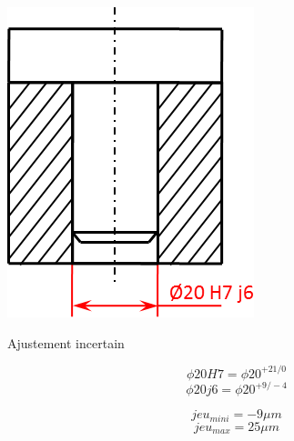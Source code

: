 \documentclass[11pt,oneside]{article}
\begin{document}
\begin{exemple}
\begin{minipage}[c]{.3\linewidth}
\end{minipage}\hfill
\begin{minipage}[c]{.3\linewidth}
\begin{center}
\includegraphics[width=.9\textwidth]{png/incertain}

Ajustement incertain
\end{center}

$$\phi 20 H7 = \phi 20^{+21/0} $$
$$\phi 20 j6 = \phi 20^{+9/-4}$$

$$jeu_{mini}= -9\mu m$$
$$jeu_{max}=25\mu m$$


\end{minipage}
\end{exemple}
\end{document}

